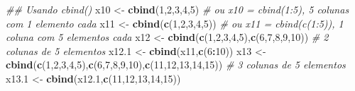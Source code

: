 \documentclass[
]{book}
\newenvironment{Shaded}{\begin{snugshade}}{\end{snugshade}}
\newcommand{\CommentTok}[1]{\textcolor[rgb]{0.56,0.35,0.01}{\textit{#1}}}
\newcommand{\DecValTok}[1]{\textcolor[rgb]{0.00,0.00,0.81}{#1}}
\newcommand{\FloatTok}[1]{\textcolor[rgb]{0.00,0.00,0.81}{#1}}
\newcommand{\KeywordTok}[1]{\textcolor[rgb]{0.13,0.29,0.53}{\textbf{#1}}}
\newcommand{\NormalTok}[1]{#1}
\newcommand{\OperatorTok}[1]{\textcolor[rgb]{0.81,0.36,0.00}{\textbf{#1}}}
\newcommand{\StringTok}[1]{\textcolor[rgb]{0.31,0.60,0.02}{#1}}
\numberwithin{equation}{section}
\begin{document}
\begin{Shaded}
\begin{Highlighting}[]
\CommentTok{\#\# Usando cbind()}
\NormalTok{x10 \textless{}{-}}\StringTok{ }\KeywordTok{cbind}\NormalTok{(}\DecValTok{1}\NormalTok{,}\DecValTok{2}\NormalTok{,}\DecValTok{3}\NormalTok{,}\DecValTok{4}\NormalTok{,}\DecValTok{5}\NormalTok{) }\CommentTok{\# ou x10 = cbind(1:5), 5 colunas com 1 elemento cada}
\NormalTok{x11 \textless{}{-}}\StringTok{ }\KeywordTok{cbind}\NormalTok{(}\KeywordTok{c}\NormalTok{(}\DecValTok{1}\NormalTok{,}\DecValTok{2}\NormalTok{,}\DecValTok{3}\NormalTok{,}\DecValTok{4}\NormalTok{,}\DecValTok{5}\NormalTok{)) }\CommentTok{\# ou x11 = cbind(c(1:5)), 1 coluna com 5 elementos cada }
\NormalTok{x12 \textless{}{-}}\StringTok{ }\KeywordTok{cbind}\NormalTok{(}\KeywordTok{c}\NormalTok{(}\DecValTok{1}\NormalTok{,}\DecValTok{2}\NormalTok{,}\DecValTok{3}\NormalTok{,}\DecValTok{4}\NormalTok{,}\DecValTok{5}\NormalTok{),}\KeywordTok{c}\NormalTok{(}\DecValTok{6}\NormalTok{,}\DecValTok{7}\NormalTok{,}\DecValTok{8}\NormalTok{,}\DecValTok{9}\NormalTok{,}\DecValTok{10}\NormalTok{)) }\CommentTok{\# 2 colunas de 5 elementos}
\NormalTok{x12}\FloatTok{.1}\NormalTok{ \textless{}{-}}\StringTok{ }\KeywordTok{cbind}\NormalTok{(x11,}\KeywordTok{c}\NormalTok{(}\DecValTok{6}\OperatorTok{:}\DecValTok{10}\NormalTok{))}
\NormalTok{x13 \textless{}{-}}\StringTok{ }\KeywordTok{cbind}\NormalTok{(}\KeywordTok{c}\NormalTok{(}\DecValTok{1}\NormalTok{,}\DecValTok{2}\NormalTok{,}\DecValTok{3}\NormalTok{,}\DecValTok{4}\NormalTok{,}\DecValTok{5}\NormalTok{),}\KeywordTok{c}\NormalTok{(}\DecValTok{6}\NormalTok{,}\DecValTok{7}\NormalTok{,}\DecValTok{8}\NormalTok{,}\DecValTok{9}\NormalTok{,}\DecValTok{10}\NormalTok{),}\KeywordTok{c}\NormalTok{(}\DecValTok{11}\NormalTok{,}\DecValTok{12}\NormalTok{,}\DecValTok{13}\NormalTok{,}\DecValTok{14}\NormalTok{,}\DecValTok{15}\NormalTok{)) }\CommentTok{\# 3 colunas de 5 elementos}
\NormalTok{x13}\FloatTok{.1}\NormalTok{ \textless{}{-}}\StringTok{ }\KeywordTok{cbind}\NormalTok{(x12}\FloatTok{.1}\NormalTok{,}\KeywordTok{c}\NormalTok{(}\DecValTok{11}\NormalTok{,}\DecValTok{12}\NormalTok{,}\DecValTok{13}\NormalTok{,}\DecValTok{14}\NormalTok{,}\DecValTok{15}\NormalTok{))}
\end{Highlighting}
\end{Shaded}
\end{document}
